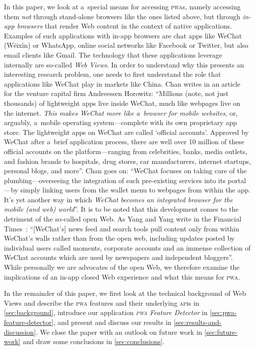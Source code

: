 \documentclass[sigconf]{acmart}
\begin{document}
In this paper, we look at a~special means for accessing \textsc{pwa}s,
namely accessing them \emph{not} through stand-alone browsers like the ones listed above,
but through \emph{in-app browsers} that render Web content in the context of native applications.
Examples of such applications with in-app browsers are chat apps like WeChat (Wēixìn) or WhatsApp,
online social networks like Facebook or Twitter, but also email clients like Gmail.
The technology that these applications leverage internally are so-called \emph{Web Views}.
In order to understand why this presents an interesting research problem,
one needs to first understand the role that applications like WeChat play in markets like China.
Chan writes in an article~\cite{chan2015wechat} for the venture capital firm Andreessen Horowitz:
``Millions (note, not just thousands) of lightweight apps live inside WeChat,
much like webpages live on the internet.
\emph{This makes WeChat more like a~browser for mobile websites}, or, arguably,
a~mobile operating system---complete with its own proprietary app store.
The lightweight apps on WeChat are called `official accounts'.
Approved by WeChat after a~brief application process,
there are well over 10 million of these official accounts on the platform---ranging
from celebrities, banks, media outlets, and fashion brands to hospitals, drug stores,
car manufacturers, internet startups, personal blogs, and more''.
Chan goes on: ``WeChat focuses on taking care of the plumbing---overseeing
the integration of such pre-existing services into its portal---by
simply linking users from the wallet menu to webpages from within the app.
It's yet another way in which \emph{WeChat
becomes an integrated browser for the mobile (and web) world}''.
It is to be noted that this development comes to the detriment of the so-called open Web.
As Yang and Yang write in the Financial Times~\cite{yang2017tencent}:
``[WeChat's] news feed and search tools pull content only from within WeChat's walls
rather than from the open web, including updates posted by individual users called moments,
corporate accounts and an immense collection of WeChat accounts
which are used by newspapers and independent bloggers''.
While personally we are advocates of the open Web,
we therefore examine the implications of an in-app closed Web experience
and what this means for \textsc{pwa}. 

In the remainder of this paper, we first look at the technical background of Web Views
and describe the \textsc{pwa} features and their underlying \textsc{api}s in \autoref{sec:background},
introduce our application \emph{\textsc{pwa} Feature Detector} in \autoref{sec:pwa-feature-detector},
and present and discuss our results in \autoref{sec:results-and-discussion}.
We close the paper with an outlook on future work in \autoref{sec:future-work}
and draw some conclusions in \autoref{sec:conclusions}.
\end{document}
